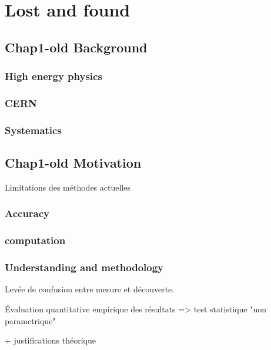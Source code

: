 
\ifpdf
    \graphicspath{{Appendix2/Figs/Raster/}{Appendix2/Figs/PDF/}{Appendix2/Figs/}}
\else
    \graphicspath{{Appendix2/Figs/Vector/}{Appendix2/Figs/}}
\fi

\chapter{Lost and found}




\section{Chap1-old Background}


\subsection{High energy physics} %
\label{sub:high_energy_physics}

\subsection{CERN} %
\label{sub:cern}


\subsection{Systematics} %
\label{sub:systematics}



\section{Chap1-old Motivation} %
\label{sec:motivation}

Limitations des méthodes actuelles

\subsection{Accuracy} %
\label{sub:accuracy}


\subsection{computation} %
\label{sub:computation}

\subsection{Understanding and methodology} %
\label{sub:understanding_and_methodology}

Levée de confusion entre mesure et découverte.

Évaluation quantitative empirique des résultats => test statistique "non parametrique"

+ justifications théorique


